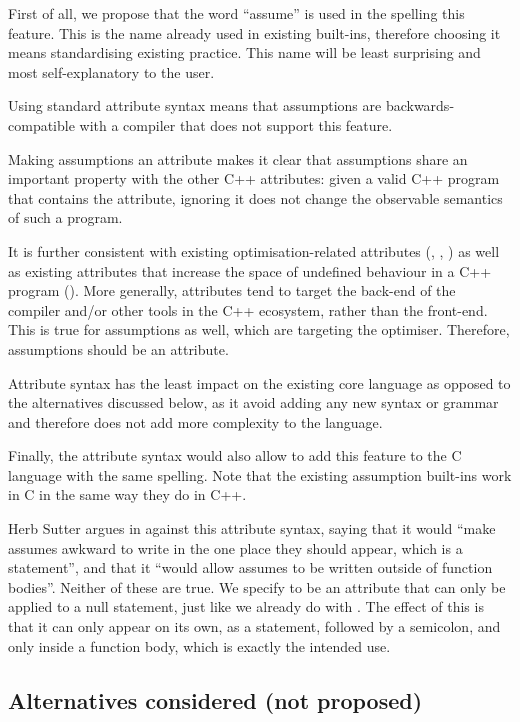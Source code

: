 First of all, we propose that the word ``assume'' is used in the spelling this feature. This is the name already used in existing built-ins, therefore choosing it means standardising existing practice. This name will be least surprising and most self-explanatory to the user.

Using standard attribute syntax means that assumptions are backwards-compatible with a compiler that does not support this feature. 

Making assumptions an attribute makes it clear that assumptions share an important property with the other C++ attributes: given a valid C++ program that contains the attribute, ignoring it does not change the observable semantics of such a program.

It is further consistent with existing optimisation-related attributes (\tcode{[[likely]]}, \tcode{[[unlikely]]}, ) as well as existing attributes that increase the space of undefined behaviour in a C++ program (\tcode{[[noreturn]]}). More generally, attributes tend to target the back-end of the compiler and/or other tools in the C++ ecosystem, rather than the front-end. This is true for assumptions as well, which are targeting the optimiser. Therefore, assumptions should be an attribute.

Attribute syntax has the least impact on the existing core language as opposed to the alternatives discussed below, as it avoid adding any new syntax or grammar and therefore does not add more complexity to the language.

Finally, the attribute syntax would also allow to add this feature to the C language with the same spelling. Note that the existing assumption built-ins work in C in the same way they do in C++.

Herb Sutter argues in \cite{P2064R0} against this attribute syntax, saying that it would ``make assumes awkward to write in the one place they should appear, which is a statement'', and that it ``would allow assumes to be written outside of function bodies''. Neither of these are true. We specify  to be an attribute that can only be applied to a null statement, just like we already do with \tcode{[[fallthrough]]}. The effect of this is that it can only appear on its own, as a statement, followed by a semicolon, and only inside a function body, which is exactly the intended use.

\subsection{Alternatives considered (not proposed)}
\label{subsec:syntax_alternatives}

